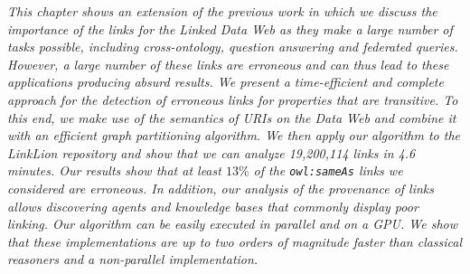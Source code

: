 \textit{This chapter shows an extension of the previous work\cite{valdestilhasdbpediasameas} in which we discuss the importance of the links for the Linked Data Web as they make a large number of tasks possible, including  cross-ontology, question answering and federated queries. However, a large number of these links are erroneous and can thus lead to these applications producing absurd results. We present a time-efficient and complete approach for the detection of erroneous links for properties that are transitive.
To this end, we make use of the semantics of URIs on the Data Web and combine it with an efficient graph partitioning algorithm. 
We then apply our algorithm to the LinkLion repository and show that we can analyze 19,200,114 links in 4.6 minutes. Our results show that at least $13\%$ of the \texttt{owl:sameAs} links we considered are erroneous. In addition, our analysis of the  provenance of links allows discovering agents and knowledge bases that commonly display poor linking.
Our algorithm can be easily executed in parallel and on a GPU. We show that these implementations are up to two orders of magnitude faster than classical reasoners and a non-parallel implementation.}

